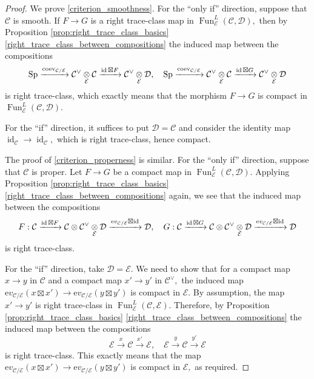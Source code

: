 \documentclass[11pt,leqno]{amsart}
\numberwithin{equation}{section}
\def\bS{\mathbb{S}}
\newcommand{\tens}[1]{%
  \mathbin{\mathop{\otimes}\displaylimits_{#1}}%
}
\newcommand{\xto}{\xrightarrow}
\newcommand{\ev}{\mathrm ev}
\newcommand{\cD}{{\mathcal D}}
\newcommand{\cC}{{\mathcal C}}
\newcommand{\cE}{{\mathcal E}}
\newcommand{\Fun}{\operatorname{Fun}}
\newcommand{\Sp}{\operatorname{Sp}}
\newcommand{\id}{\operatorname{id}}
\newcommand{\coev}{\operatorname{coev}}
\begin{document}
\begin{proof}
We prove \ref{criterion_smoothness}. For the ``only if'' direction, suppose that $\cC$ is smooth. 
If $F\to G$ is a right trace-class map in $\Fun^L_{\cE}(\cC,\cD),$ then by Proposition \ref{prop:right_trace_class_basics} \ref{right_trace_class_between_compositions} the induced map between the compositions
\begin{equation*}
\Sp\xto{\coev_{\cC/\cE}}\cC^{\vee}\tens{\cE}\cC \xto{\id\boxtimes F} \cC^{\vee}\tens{\cE}\cD,\quad \Sp\xto{\coev_{\cC/\cE}}\cC^{\vee}\tens{\cE}\cC \xto{\id\boxtimes G} \cC^{\vee}\tens{\cE}\cD
\end{equation*}
is right trace-class, which exactly means that the morphism $F\to G$ is compact in $\Fun^L_{\cE}(\cC,\cD).$

For the ``if'' direction, it suffices to put $\cD=\cC$ and consider the identity map $\id_{\cC}\to\id_{\cC},$ which is right trace-class, hence compact.

The proof of \ref{criterion_properness} is similar. For the ``only if'' direction, suppose that $\cC$ is proper. Let $F\to G$ be a compact map in $\Fun^L_{\cE}(\cC,\cD).$ %
Applying Proposition \ref{prop:right_trace_class_basics} \ref{right_trace_class_between_compositions} again, we see that the induced map between the compositions
\begin{equation*}
F:\cC\xto{\id\boxtimes F}\cC\otimes\cC^{\vee}\tens{\cE}\cD\xto{\ev_{\cC/\cE}\boxtimes\id}\cD,\quad G:\cC\xto{\id\boxtimes G}\cC\otimes\cC^{\vee}\tens{\cE}\cD\xto{\ev_{\cC/\cE}\boxtimes\id}\cD
\end{equation*}
is right trace-class.

For the ``if'' direction, take $\cD=\cE.$ We need to show that for a compact map $x\to y$ in $\cC$ and a compact map $x'\to y'$ in $\cC^{\vee},$
the induced map $\ev_{\cC/\cE}(x\boxtimes x')\to \ev_{\cC/\cE}(y\boxtimes y')$ is compact in $\cE.$ By assumption, the map $x'\to y'$ is right trace-class in $\Fun_{\cE}^L(\cC,\cE).$ Therefore,
by Proposition \ref{prop:right_trace_class_basics} \ref{right_trace_class_between_compositions} the induced map between the compositions
\begin{equation*}
\cE\xto{x}\cC\xto{x'}\cE,\quad \cE\xto{y}\cC\xto{y'}\cE
\end{equation*}
is right trace-class. This exactly means that the map $\ev_{\cC/\cE}(x\boxtimes x')\to \ev_{\cC/\cE}(y\boxtimes y')$ is compact in $\cE,$ as required. 
\end{proof}
\end{document}
